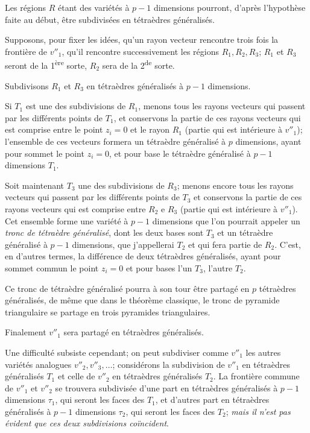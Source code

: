 \documentclass{article}
\begin{document}
Les régions $R$ étant des variétés à $p - 1$ dimensions pourront, d'après l'hypothèse faite au début, être subdivisées en tétraèdres généralisés.

Supposons, pour fixer les idées, qu'un rayon vecteur rencontre trois fois la frontière de $v''_{1}$, qu'il rencontre successivement les régions $R_{1}, R_{2}, R_{3}$; $R_{1}$ et $R_{3}$ seront de la 1\textsuperscript{ère} sorte, $R_{2}$ sera de la 2\textsuperscript{de} sorte.

Subdivisons $R_{1}$ et $R_{3}$ en tétraèdres généralisés à $p - 1$ dimensions.

Si $T_{1}$ est une des subdivisions de $R_{1}$, menons tous les rayons vecteurs qui passent par les différents points de $T_{1}$, et conservons la partie de ces rayons vecteurs qui est comprise entre le point $z_{i} = 0$ et le rayon $R_{1}$ (partie qui est intérieure à $v''_{1}$); l'ensemble de ces vecteurs formera un tétraèdre généralisé à $p$ dimensions, ayant pour sommet le point $z_{i} = 0$, et pour base le tétraèdre généralisé à $p - 1$ dimensions $T_{1}$.


Soit maintenant $T_{3}$ une des subdivisions de $R_{3}$; menons encore tous les rayons vecteurs qui passent par les différents points de $T_{3}$ et conservons la partie de ces rayons vecteurs qui est comprise entre $R_{2}$ e $R_{3}$ (partie qui est intérieure à $v''_{1}$). Cet ensemble forme une variété à $p - 1$ dimensions que l'on pourrait appeler un \emph{tronc de tétraèdre généralisé}, dont les deux bases sont $T_{3}$ et un tétraèdre généralisé à $p - 1$ dimensions, que j'appellerai $T_{2}$ et qui fera partie de $R_{2}$. C'est, en d'autres termes, la différence de deux tétraèdres généralisés, ayant pour sommet commun le point $z_{i} = 0$ et pour bases l'un $T_{3}$, l'autre $T_{2}$.

Ce tronc de tétraèdre généralisé pourra à son tour être partagé en $p$ tétraèdres généralisés, de même que dans le théorème classique, le tronc de pyramide triangulaire se partage en trois pyramides triangulaires.

Finalement $v''_{1}$ sera partagé en tétraèdres généralisés.

Une difficulté subsiste cependant; on peut subdiviser comme $v''_{1}$ les autres variétés analogues $v''_{2}, v''_{3}, \ldots$; considérons la subdivision de $v''_{1}$ en tétraèdres généralisés $T_{1}$ et celle de $v''_{2}$ en tétraèdres généralisés $T_{2}$. La frontière commune de $v''_{1}$ et $v''_{2}$ se trouvera subdivisée d'une part en tétraèdres généralisés à $p - 1$ dimensions $\tau_{1}$, qui seront les faces des $T_{1}$, et d'autres part en tétraèdres généralisés à $p - 1$ dimensions $\tau_{2}$, qui seront les faces des $T_{2}$; \emph{mais il n'est pas évident que ces deux subdivisions coïncident}.
\end{document}
